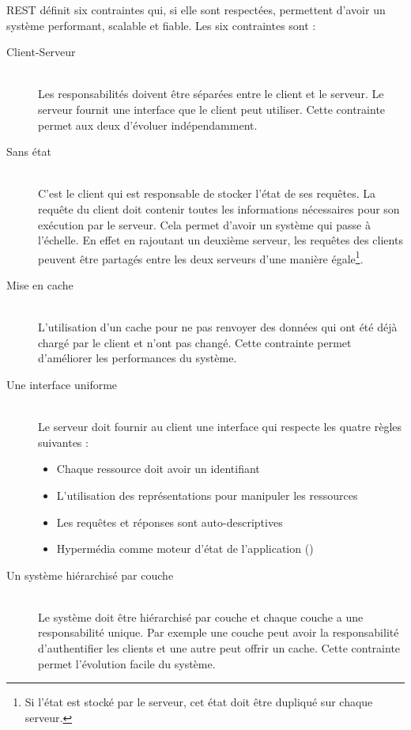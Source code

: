 REST définit six contraintes qui, si elle sont respectées, permettent d'avoir
un système performant, scalable et fiable. Les six contraintes sont :

\begin{description} 
    \item[Client-Serveur]\hfill\\ 
        Les responsabilités doivent être séparées entre le client et le serveur. 
        Le serveur fournit une interface que le client peut utiliser. Cette 
        contrainte permet aux deux d'évoluer indépendamment.

    \item[Sans état]\hfill\\ 
        C'est le client qui est responsable de stocker l'état de ses requêtes. 
        La requête du client doit contenir toutes les informations nécessaires 
        pour son exécution par le serveur. Cela permet d'avoir un système qui passe à l'échelle. 
        En effet en rajoutant un deuxième serveur, les requêtes des clients peuvent 
        être partagés entre les deux serveurs d'une manière égale\footnote{Si l'état 
        est stocké par le serveur, cet état doit être dupliqué sur chaque serveur.}.

    \item[Mise en cache]\hfill\\ 
        L'utilisation d'un cache pour ne pas renvoyer des données qui ont été déjà 
        chargé par le client et n'ont pas changé. Cette contrainte permet d'améliorer 
        les performances du système.

    \item[Une interface uniforme]\hfill\\ 
        Le serveur doit fournir au client une interface qui respecte les quatre règles 
        suivantes : 
        \begin{itemize} 
            \item Chaque ressource doit avoir un identifiant 
            \item L'utilisation des représentations pour manipuler les ressources 
            \item Les requêtes et réponses sont auto-descriptives 
            \item Hypermédia comme moteur d'état de l'application ()	 
        \end{itemize} 

    \item[Un système hiérarchisé par couche]\hfill\\ Le système doit être hiérarchisé par 
        couche et chaque couche a une responsabilité unique. Par exemple une couche peut 
        avoir la responsabilité d'authentifier les clients et une autre peut offrir un cache. 
        Cette contrainte permet l'évolution facile du système.


\end{description}
